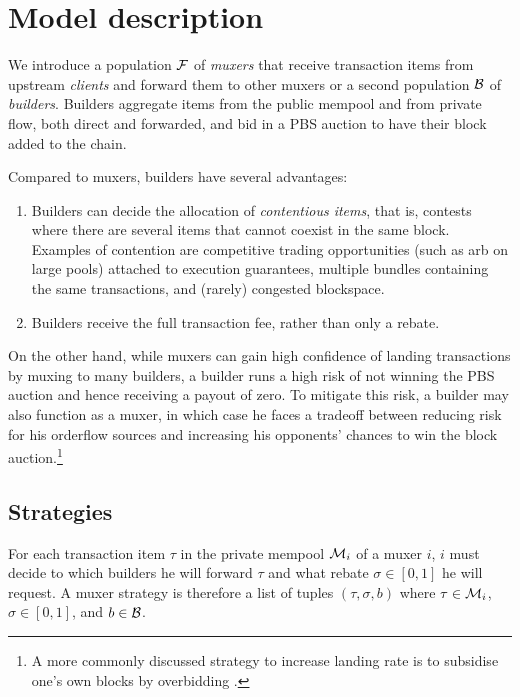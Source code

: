 

\section*{Model description}

We introduce a population $\mathcal{F}$ of \emph{muxers} that receive transaction items from upstream \emph{clients} and forward them to other muxers or a second population $\mathcal{B}$ of \emph{builders}.
%
Builders aggregate items from the public mempool and from private flow, both direct and forwarded, and bid in a PBS auction to have their block added to the chain.

Compared to muxers, builders have several advantages:
%
\begin{enumerate}
  \item 
    Builders can decide the allocation of \emph{contentious items}, that is, contests where there are several items that cannot coexist in the same block.
    Examples of contention are competitive trading opportunities (such as arb on large pools) attached to execution guarantees, multiple bundles containing the same transactions, and (rarely) congested blockspace.

  \item
    Builders receive the full transaction fee, rather than only a rebate.

\end{enumerate}
%
On the other hand, while muxers can gain high confidence of landing transactions by muxing to many builders, a builder runs a high risk of not winning the PBS auction and hence receiving a payout of zero.
%
To mitigate this risk, a builder may also function as a muxer, in which case he faces a tradeoff between reducing risk for his orderflow sources and increasing his opponents' chances to win the block auction.\footnote{A more commonly discussed strategy to increase landing rate is to subsidise one's own blocks by overbidding \cite{titan2023builder}.}

\subsection*{Strategies}

For each transaction item $\tau$ in the private mempool $\mathcal{M}_i$ of a muxer $i$, $i$ must decide to which builders he will forward $\tau$ and what rebate $\sigma\in[0,1]$ he will request.
%
A muxer strategy is therefore a list of tuples $(\tau,\sigma,b)$ where $\tau\in\mathcal{M}_i$, $\sigma\in[0,1]$, and $b\in\mathcal{B}$.

